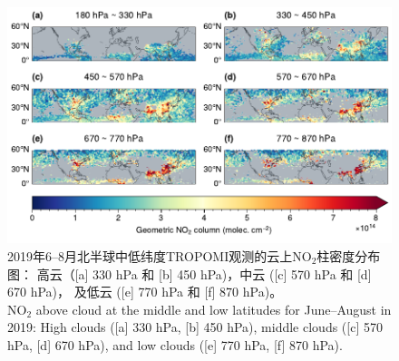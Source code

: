 \begin{figure}[htbp]
    \centering
    \includegraphics[width=15cm]{./figures/no2geo_tropomi.pdf}
    \caption{
    2019年6--8月北半球中低纬度TROPOMI观测的云上NO$_2$柱密度分布图：
    高云（[a] 330 hPa 和 [b] 450 hPa)，中云 ([c] 570 hPa 和 [d] 670 hPa)，
    及低云 ([e] 770 hPa 和 [f] 870 hPa)。 \\
    NO$_2$ above cloud at the middle and low latitudes for June--August in 2019:
    High clouds ([a] 330 hPa, [b] 450 hPa), middle clouds ([c] 570 hPa, [d] 670 hPa),
    and low clouds ([e] 770 hPa, [f] 870 hPa).
    }
    \label{fig:no2geo_tropomi}
\end{figure}


